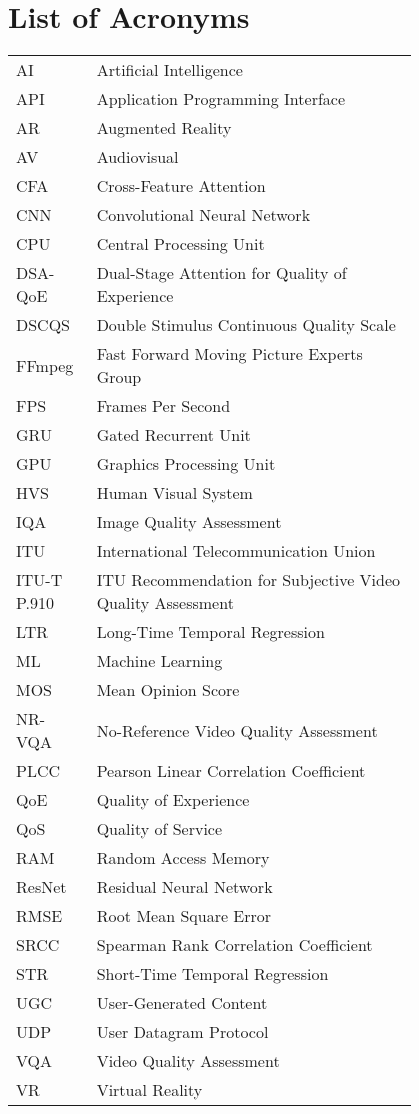 \chapter*{List of Acronyms}

\begin{flushleft}
\begin{tabular}{l p{0.8\linewidth}}
AI & Artificial Intelligence \\
API & Application Programming Interface \\
AR & Augmented Reality \\
AV & Audiovisual \\
CFA & Cross-Feature Attention \\
CNN & Convolutional Neural Network \\
CPU & Central Processing Unit \\
DSA-QoE & Dual-Stage Attention for Quality of Experience \\
DSCQS & Double Stimulus Continuous Quality Scale \\
FFmpeg & Fast Forward Moving Picture Experts Group \\
FPS & Frames Per Second \\
GRU & Gated Recurrent Unit \\
GPU & Graphics Processing Unit \\
HVS & Human Visual System \\
IQA & Image Quality Assessment \\
ITU & International Telecommunication Union \\
ITU-T P.910 & ITU Recommendation for Subjective Video Quality Assessment \\
LTR & Long-Time Temporal Regression \\
ML & Machine Learning \\
MOS & Mean Opinion Score \\
NR-VQA & No-Reference Video Quality Assessment \\
PLCC & Pearson Linear Correlation Coefficient \\
QoE & Quality of Experience \\
QoS & Quality of Service \\
RAM & Random Access Memory \\
ResNet & Residual Neural Network \\
RMSE & Root Mean Square Error \\
SRCC & Spearman Rank Correlation Coefficient \\
STR & Short-Time Temporal Regression \\
UGC & User-Generated Content \\
UDP & User Datagram Protocol \\
VQA & Video Quality Assessment \\
VR & Virtual Reality \\
\end{tabular}
\end{flushleft}